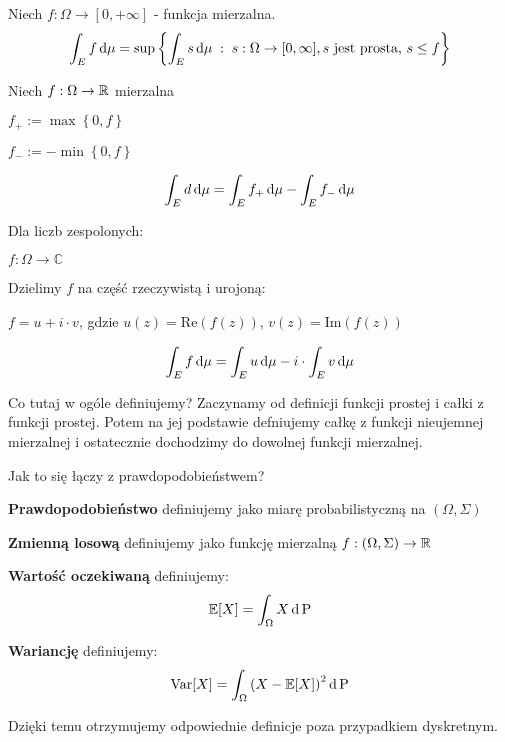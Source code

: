 \begin{definition}
    Niech \( f: \Omega\to [0, +\infty] \) - funkcja mierzalna.
    \[
        \int_E f \mathop{}\!\mathrm{d} \mu = \sup \left\{\int_E s \mathop{}\!\mathrm{d} \mu \; : \; s: \Omega\to [0, \infty], s \text{ jest prosta, } s \leq f \right\}
    \]
\end{definition}

\begin{definition}
    Niech  \( f: \Omega\to \mathbb{R} \) mierzalna

    \( f_+ := \max \left\{0, f\right\} \)

    \( f_- := -\min \left\{0, f\right\} \)

    \[
        \int_E d \mathop{}\!\mathrm{d} \mu = \int_E f_+ \mathop{}\!\mathrm{d} \mu - \int_E f_- \mathop{}\!\mathrm{d} \mu
    \]
\end{definition}

\begin{definition}
    Dla liczb zespolonych:

    \( f: \Omega\to \mathbb{C} \)

    Dzielimy \( f \) na część rzeczywistą i urojoną:

    \( f = u + i \cdot v \), gdzie \( u\left( z \right) = \text{Re}\left( f\left( z \right) \right) \), \( v\left( z \right) = \text{Im}\left( f\left( z \right) \right) \)

    \[
        \int_E f \mathop{}\!\mathrm{d} \mu = \int_E u \mathop{}\!\mathrm{d} \mu - i \cdot \int_E v \mathop{}\!\mathrm{d} \mu
    \]
\end{definition}

Co tutaj w ogóle definiujemy? Zaczynamy od definicji funkcji prostej i całki z funkcji prostej. Potem na jej podstawie defniujemy całkę z funkcji nieujemnej mierzalnej i ostatecznie dochodzimy do dowolnej funkcji mierzalnej.


\begin{corollary}

    Jak to się łączy z prawdopodobieństwem?

    \textbf{Prawdopodobieństwo} definiujemy jako miarę probabilistyczną na \( \left( \Omega, \Sigma \right) \)

    \textbf{Zmienną losową} definiujemy jako funkcję mierzalną \( f: \left( \Omega, \Sigma \right) \to \mathbb{R} \)

    \textbf{Wartość oczekiwaną} definiujemy:
    \[
        \expected{X} = \int_{\Omega} X \diff \prob
    \]

    \textbf{Wariancję} definiujemy:
    \[
        \variance{X} = \int_{\Omega} \left( X - \expected{X} \right)^2 \diff \prob
    \]

    Dzięki temu otrzymujemy odpowiednie definicje poza przypadkiem dyskretnym.
\end{corollary}

